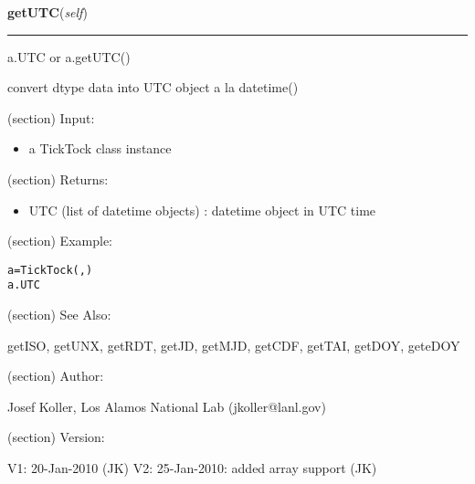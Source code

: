     \label{spacepy:spacetime:TickTock:getUTC}

    \vspace{0.5ex}

\hspace{.8\funcindent}\begin{boxedminipage}{\funcwidth}

    \raggedright \textbf{getUTC}(\textit{self})

    \vspace{-1.5ex}

    \rule{\textwidth}{0.5\fboxrule}
\setlength{\parskip}{2ex}
    a.UTC or a.getUTC()

    convert dtype data into UTC object a la datetime()

    (section) Input:

      \begin{itemize}
      \setlength{\parskip}{0.6ex}
        \item a TickTock class instance

      \end{itemize}

    (section) Returns:

      \begin{itemize}
      \setlength{\parskip}{0.6ex}
        \item UTC (list of datetime objects) : datetime object in UTC time

      \end{itemize}

    (section) Example:

\begin{alltt}
\pysrcprompt{{\textgreater}{\textgreater}{\textgreater} }a = TickTock(, )
\pysrcprompt{{\textgreater}{\textgreater}{\textgreater} }a.UTC
\end{alltt}
    (section) See Also:

      getISO, getUNX, getRDT, getJD, getMJD, getCDF, getTAI, getDOY, 
      geteDOY

    (section) Author:

      Josef Koller, Los Alamos National Lab (jkoller@lanl.gov)

    (section) Version:

      V1: 20-Jan-2010 (JK) V2: 25-Jan-2010: added array support (JK)

\setlength{\parskip}{1ex}
    \end{boxedminipage}

